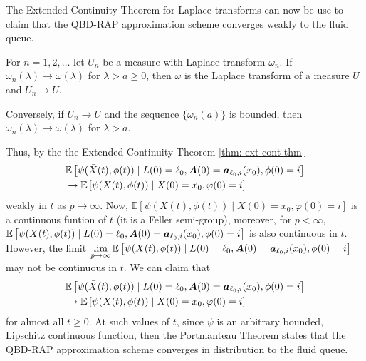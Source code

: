 The Extended Continuity Theorem for Laplace transforms \cite[Chapter XIII, Theorem 2a]{feller1957} can now be use to claim that the QBD-RAP approximation scheme converges weakly to the fluid queue.
\begin{thm}\label{thm: ext cont thm}
	For \(n=1,2,\dots\) let \(U_n\) be a measure with Laplace transform \(\omega_n\). If \(\omega_n(\lambda)\to\omega(\lambda)\) for \(\lambda > a\geq 0\), then \(\omega\) is the Laplace transform of a measure \(U\) and \(U_n\to U\).
	
	Conversely, if \(U_n\to U\) and the sequence \(\{\omega_n(a)\}\) is bounded, then \(\omega_n(\lambda)\to\omega(\lambda)\) for \(\lambda >a\). 
\end{thm}
Thus, by the the Extended Continuity Theorem \ref{thm: ext cont thm}
\begin{align}
		&\mathbb E\left[\psi(\bar X(t),\phi(t))  \mid L(0)=\ell_0, \boldsymbol A(0)=\boldsymbol  a_{\ell_0,i}(x_0), \phi(0)=i \right] \nonumber
		\\&\to \mathbb E\left[\psi(X(t),\phi(t))\mid X(0)=x_0, \varphi(0)=i \right] \nonumber
\end{align}
weakly in \(t\) as \(p\to \infty\). Now, \( \mathbb E\left[\psi(X(t),\phi(t))\mid X(0)=x_0, \varphi(0)=i \right]\) is a continuous funtion of \(t\) (it is a Feller semi-group), moreover, for \(p<\infty\), \(\mathbb E\left[\psi(\bar X(t),\phi(t))  \mid L(0)=\ell_0, \boldsymbol A(0)=\boldsymbol  a_{\ell_0,i}(x_0), \phi(0)=i \right] \) is also continuous in \(t\). However, the limit \(\lim\limits_{p\to\infty}\mathbb E\left[\psi(\bar X(t),\phi(t))  \mid L(0)=\ell_0, \boldsymbol A(0)=\boldsymbol  a_{\ell_0,i}(x_0), \phi(0)=i \right] \) may not be continuous in \(t\). We can claim that 
\begin{align}
		&\mathbb E\left[\psi(\bar X(t),\phi(t))  \mid L(0)=\ell_0, \boldsymbol A(0)=\boldsymbol  a_{\ell_0,i}(x_0), \phi(0)=i \right] \nonumber
		\\&\to \mathbb E\left[\psi(X(t),\phi(t))\mid X(0)=x_0, \varphi(0)=i \right] \nonumber
\end{align}
for almost all \(t\geq 0\). At such values of \(t\), since \(\psi\) is an arbitrary bounded, Lipschitz continuous function, then the Portmanteau Theorem states that the QBD-RAP approximation scheme converges in distribution to the fluid queue. 
